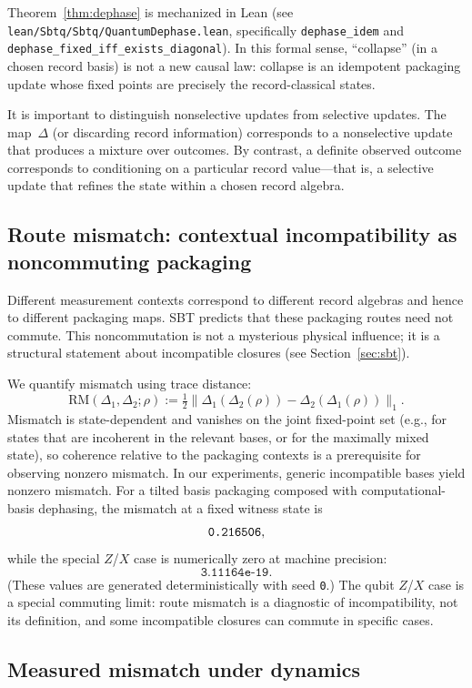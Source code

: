 \documentclass[11pt]{article}
\newcommand{\CTXMismatchZX}{3.11164e-19}
\newcommand{\RepoSeed}{0}
\begin{document}
Theorem~\ref{thm:dephase} is mechanized in Lean (see \texttt{lean/Sbtq/Sbtq/QuantumDephase.lean}, specifically \texttt{dephase\_idem} and \texttt{dephase\_fixed\_iff\_exists\_diagonal}).
In this formal sense, ``collapse'' (in a chosen record basis) is not a new causal law: collapse is an idempotent packaging update whose fixed points are precisely the record-classical states.

It is important to distinguish nonselective updates from selective updates. The map~$\Delta$ (or discarding record information) corresponds to a nonselective update that produces a mixture over outcomes. By contrast, a definite observed outcome corresponds to conditioning on a particular record value---that is, a selective update that refines the state within a chosen record algebra.

\subsection{Route mismatch: contextual incompatibility as noncommuting packaging}

Different measurement contexts correspond to different record algebras and hence to different packaging maps.
SBT predicts that these packaging routes need not commute.
This noncommutation is not a mysterious physical influence; it is a structural statement about incompatible closures (see Section~\ref{sec:sbt}).

We quantify mismatch using trace distance:
\[
\mathrm{RM}(\Delta_1,\Delta_2;\rho) := \tfrac12\|\Delta_1(\Delta_2(\rho))-\Delta_2(\Delta_1(\rho))\|_1.
\]
Mismatch is state-dependent and vanishes on the joint fixed-point set (e.g., for states that are incoherent in the relevant bases, or for the maximally mixed state), so coherence relative to the packaging contexts is a prerequisite for observing nonzero mismatch.
In our experiments, generic incompatible bases yield nonzero mismatch.
For a tilted basis packaging composed with computational-basis dephasing, the mismatch at a fixed witness state is
\[
\texttt{0.216506},
\]
while the special $Z$/$X$ case is numerically zero at machine precision:
\[
\texttt{\CTXMismatchZX}.
\]
(These values are generated deterministically with seed \texttt{\RepoSeed}.) The qubit $Z$/$X$ case is a special commuting limit: route mismatch is a diagnostic of incompatibility, not its definition, and some incompatible closures can commute in specific cases.

\subsection{Measured mismatch under dynamics}
\end{document}
